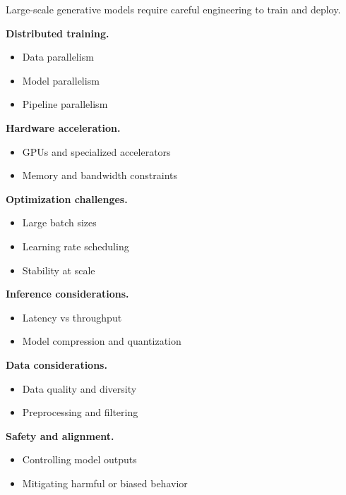 Large-scale generative models require careful engineering to train and deploy.

\medskip

\noindent
\textbf{Distributed training.}
\begin{itemize}
    \item Data parallelism
    \item Model parallelism
    \item Pipeline parallelism
\end{itemize}

\medskip

\noindent
\textbf{Hardware acceleration.}
\begin{itemize}
    \item GPUs and specialized accelerators
    \item Memory and bandwidth constraints
\end{itemize}

\medskip

\noindent
\textbf{Optimization challenges.}
\begin{itemize}
    \item Large batch sizes
    \item Learning rate scheduling
    \item Stability at scale
\end{itemize}

\medskip

\noindent
\textbf{Inference considerations.}
\begin{itemize}
    \item Latency vs throughput
    \item Model compression and quantization
\end{itemize}

\medskip

\noindent
\textbf{Data considerations.}
\begin{itemize}
    \item Data quality and diversity
    \item Preprocessing and filtering
\end{itemize}

\medskip

\noindent
\textbf{Safety and alignment.}
\begin{itemize}
    \item Controlling model outputs
    \item Mitigating harmful or biased behavior
\end{itemize}

